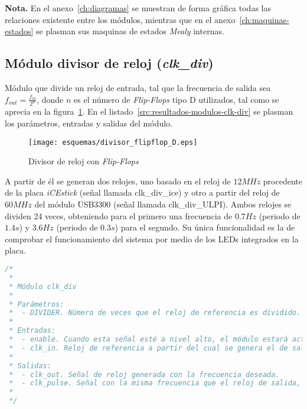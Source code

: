 \textbf{Nota.} En el anexo~\ref{ch:diagramas} se muestran de forma gráfica todas las relaciones existente entre los módulos, mientras que en el anexo~\ref{ch:maquinas-estados} se plasman sus maquinas de estados \emph{Mealy} internas.

\subsection{Módulo divisor de reloj (\emph{clk\_div})}
Módulo que divide un reloj de entrada, tal que la frecuencia de salida sea $f_{out} = \frac{f_{in}}{2^n}$, donde $n$ es el número de \emph{Flip-Flops} tipo D utilizados, tal como se aprecia en la figura~\ref{fig:clk_div_esquema}. En el listado~\ref{src:resultados-modulos-clk-div} se plasman los parámetros, entradas y salidas del módulo.

\begin{figure}[hbt]
    \centering
    \texttt{[image: esquemas/divisor\_flipflop\_D.eps]}
    \caption{Divisor de reloj con \emph{Flip-Flops}}
    \label{fig:clk_div_esquema}
\end{figure}

A partir de él se generan dos relojes, uno basado en el reloj de $12MHz$ procedente de la placa \emph{iCEstick} (señal llamada clk\_div\_ice) y otro a partir del reloj de $60MHz$ del módulo USB3300 (señal  llamada clk\_div\_ULPI). Ambos relojes se dividen 24 veces, obteniendo para el primero una frecuencia de $0.7Hz$ (periodo de $1.4s$) y $3.6Hz$ (periodo de $0.3s$) para el segundo. Su única funcionalidad es la de  comprobar el funcionamiento del sistema por medio de los LEDs integrados en la placa.

\begin{lstlisting}[language=Verilog,
    caption={Parámetros, entradas y salidas del módulo clk\_div.},
    label=src:resultados-modulos-clk-div]
/*
 *
 * Módulo clk_div
 *
 * Parámetros:
 *  - DIVIDER. Número de veces que el reloj de referencia es dividido. f_clk_out = f_clk_in / (2^DIVIDER)
 *
 * Entradas:
 *  - enable. Cuando esta señal esté a nivel alto, el módulo estará activo, y en caso contrario la salida estará siempre a nivel bajo.
 *  - clk_in. Reloj de referencia a partir del cual se genera el de salida.
 *
 * Salidas:
 *  - clk_out. Señal de reloj generada con la frecuencia deseada.
 *  - clk_pulse. Señal con la misma frecuencia que el reloj de salida, pero con un ancho de pulso igual al del reloj de entrada.
 *
 */
\end{lstlisting}

